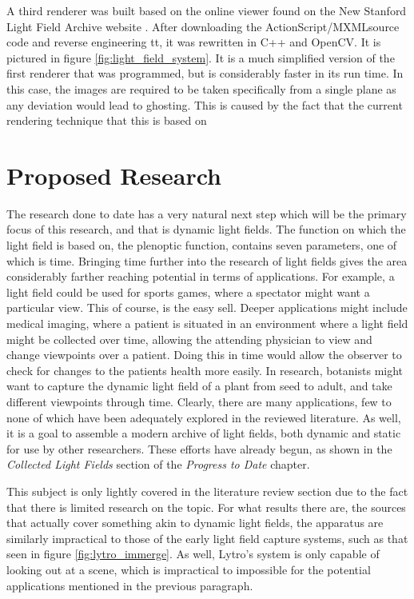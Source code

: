 \documentclass[12pt]{report}
\begin{document}
A third renderer was built based on the online viewer found on the New Stanford Light Field Archive website \cite{lfArchive}. After downloading the ActionScript/MXMLsource code and reverse engineering tt, it was rewritten in C++ and OpenCV. It is pictured in figure \ref{fig:light_field_system}. It is a much simplified version of the first renderer that was programmed, but is considerably faster in its run time. In this case, the images are required to be taken specifically from a single plane as any deviation would lead to ghosting. This is caused by the fact that the current rendering technique that this is based on 

\chapter{Proposed Research}

The research done to date has a very natural next step which will be the primary focus of this research, and that is dynamic light fields. The function on which the light field is based on, the plenoptic function, contains seven parameters, one of which is time. Bringing time further into the research of light fields gives the area considerably farther reaching potential in terms of applications. For example, a light field could be used for sports games, where a spectator might want a particular view. This of course, is the easy sell. Deeper applications might include medical imaging, where a patient is situated in an environment where a light field might be collected over time, allowing the attending physician to view and change viewpoints over a patient. Doing this in time would allow the observer to check for changes to the patients health more easily. In research, botanists might want to capture the dynamic light field of a plant from seed to adult, and take different viewpoints through time. Clearly, there are many applications, few to none of which have been adequately explored in the reviewed literature. As well, it is a goal to assemble a modern archive of light fields, both dynamic and static for use by other researchers. These efforts have already begun, as shown in the \emph{Collected Light Fields} section of the \emph{Progress to Date} chapter.

This subject is only lightly covered in the literature review section due to the fact that there is limited research on the topic. For what results there are, the sources that actually cover something akin to dynamic light fields, the apparatus are similarly impractical to those of the early light field capture systems, such as that seen in figure \ref{fig:lytro_immerge}. As well, Lytro's system is only capable of looking out at a scene, which is impractical to impossible for the potential applications mentioned in the previous paragraph. 
\end{document}
